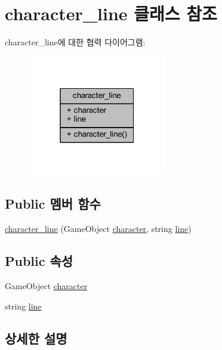 \hypertarget{classcharacter__line}{}\section{character\+\_\+line 클래스 참조}
\label{classcharacter__line}


character\+\_\+line에 대한 협력 다이어그램\+:\nopagebreak
\begin{figure}[H]
\begin{center}
\leavevmode
\includegraphics[width=172pt]{d8/d02/classcharacter__line__coll__graph}
\end{center}
\end{figure}
\subsection*{Public 멤버 함수}
\begin{DoxyCompactItemize}
\item 
\mbox{\hyperlink{classcharacter__line_ad2d61fa2bbee517f200182cd489f6e97}{character\+\_\+line}} (Game\+Object \mbox{\hyperlink{classcharacter__line_a4a1026262ac1e5c5eb266c1bc1432d2c}{character}}, string \mbox{\hyperlink{classcharacter__line_a088bbc85d8d168464f1e76262690413b}{line}})
\end{DoxyCompactItemize}
\subsection*{Public 속성}
\begin{DoxyCompactItemize}
\item 
Game\+Object \mbox{\hyperlink{classcharacter__line_a4a1026262ac1e5c5eb266c1bc1432d2c}{character}}
\item 
string \mbox{\hyperlink{classcharacter__line_a088bbc85d8d168464f1e76262690413b}{line}}
\end{DoxyCompactItemize}


\subsection{상세한 설명}


